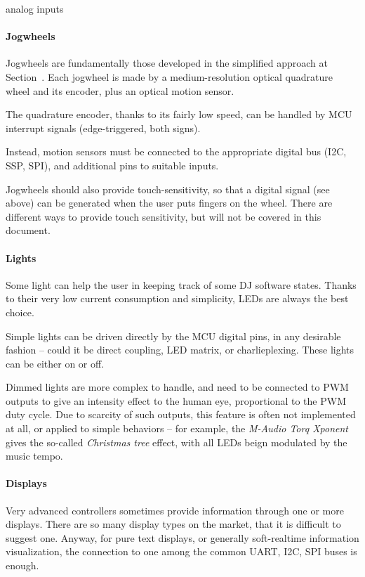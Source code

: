 \documentclass[a4paper,10pt]{article}
\begin{document}
\begin{multicols}{2}
\INSFIG analog inputs


\paragraph{Jogwheels}
Jogwheels are fundamentally those developed in the simplified approach at
Section~\CITEME. Each jogwheel is made by a medium-resolution optical
quadrature wheel and its encoder, plus an optical motion sensor.

The quadrature encoder, thanks to its fairly low speed, can be handled by
MCU interrupt signals (edge-triggered, both signs).

Instead, motion sensors must be connected to the appropriate digital bus
(I2C, SSP, SPI), and additional pins to suitable inputs.

Jogwheels should also provide touch-sensitivity, so that a digital signal
(see above) can be generated when the user puts fingers on the wheel.
There are different ways to provide touch sensitivity, but will not be
covered in this document.


\paragraph{Lights}
Some light can help the user in keeping track of some DJ software states.
Thanks to their very low current consumption and simplicity, LEDs are
always the best choice.

Simple lights can be driven directly by the MCU digital pins, in
any desirable fashion -- could it be direct coupling, LED matrix,
or charlieplexing. These lights can be either on or off.

Dimmed lights are more complex to handle, and need to be connected to PWM
outputs to give an intensity effect to the human eye, proportional to the
PWM duty cycle. Due to scarcity of such outputs, this feature is often not
implemented at all, or applied to simple behaviors -- for example, the
\emph{M-Audio Torq Xponent}\cite{maudio_xponent} gives the so-called
\emph{Christmas tree} effect, with all LEDs beign modulated by the music tempo.


\paragraph{Displays}
Very advanced controllers sometimes provide information through one or more
displays. There are so many display types on the market, that it is difficult
to suggest one. Anyway, for pure text displays, or generally soft-realtime
information visualization, the connection to one among the common UART, I2C,
SPI buses is enough.


\end{multicols}
\end{document}
